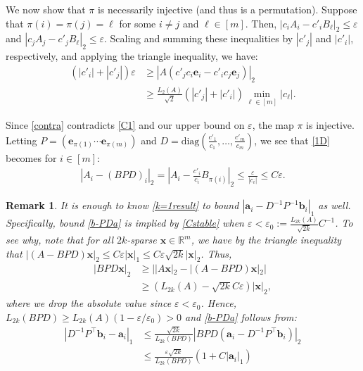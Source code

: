 \documentclass[journal, twocolumn]{IEEEtran}
\newtheorem{remark}{Remark}
\begin{document}
We  now show that $\pi$ is necessarily injective (and thus is a permutation). %
Suppose that $\pi(i) = \pi(j) = \ell$ for some $i \neq j$ and $\ell \in [m]$. Then, $|c_iA_i - c'_iB_{\ell}|_2  \leq \varepsilon$ and $|c_jA_j - c'_jB_{\ell}|_2 \leq \varepsilon$. Scaling and summing these inequalities by $|c'_j|$ and $|c'_i|$, respectively, and applying the triangle inequality, we have:
\begin{align}\label{contra}
(|c'_i| + |c'_j|) \varepsilon
&\geq |A(c'_jc_i\mathbf{e}_i - c'_ic_j\mathbf{e}_j)|_2 \nonumber \\ 
&\geq \frac{L_2(A)}{\sqrt{2}} \left( |c'_j| + |c'_i| \right) \min_{\ell \in [m]} |c_\ell |.
\end{align}
%

Since \eqref{contra} contradicts \eqref{C1} and our upper bound on $\varepsilon$, the map $\pi$ is injective. Letting $P = \left( \mathbf{e}_{\pi(1)} \cdots \mathbf{e}_{\pi(m)}\right)$ and $D = \text{diag}(\frac{c'_1}{c_1},\ldots,\frac{c'_m}{c_m})$, we see that \eqref{1D} becomes for $i \in [m]$:
\begin{align}\label{k=1result}
|A_i - (BPD)_i|_2 = |A_i - \frac{c'_i}{c_i}B_{\pi(i)}|_2 \leq \frac{\varepsilon}{|c_i|} \leq C\varepsilon.
\end{align}

\begin{remark}\label{b-PDaProof}
It is enough to know \eqref{k=1result} to bound \mbox{$|\mathbf{a}_i - D^{-1}P^{-1}\mathbf{b}_i|_1$} as well. Specifically, bound \eqref{b-PDa} is implied by \eqref{Cstable} when $\varepsilon < \varepsilon_0 := \frac{L_{2k}(A)}{\sqrt{2k}}C^{-1}$. To see why, note that for all $2k$-sparse $\mathbf{x} \in \mathbb{R}^m$, we have by the triangle inequality that \mbox{$|(A-BPD)\mathbf{x}|_2  \leq C\varepsilon|\mathbf{x}|_1 \leq C \varepsilon \sqrt{2k}  |\mathbf{x}|_2$}. Thus,
\begin{align*}
|BPD\mathbf{x}|_2 
&\geq | |A\mathbf{x}|_2 - |(A-BPD)\mathbf{x}|_2 | \\
&\geq (L_{2k}(A) - \sqrt{2k}C\varepsilon ) |\mathbf{x}|_2,
\end{align*}
%
where we drop the absolute value since $\varepsilon < \varepsilon_0$. Hence, $L_{2k}(BPD) \geq L_{2k}(A)\left( 1 - \varepsilon/\varepsilon_0 \right) > 0$ and \eqref{b-PDa} follows from:
\begin{align*}
|D^{-1}P^{\top}\mathbf{b}_i - \mathbf{a}_i|_1
&\leq \frac{\sqrt{2k}}{L_{2k}(BPD)}|BPD(\mathbf{a}_i - D^{-1}P^{\top}\mathbf{b}_i)|_2 \\
&\leq \frac{\varepsilon\sqrt{2k}}{L_{2k}(BPD)}(1+C|\mathbf{a}_i|_1)
\end{align*}
\end{remark}
\end{document}
